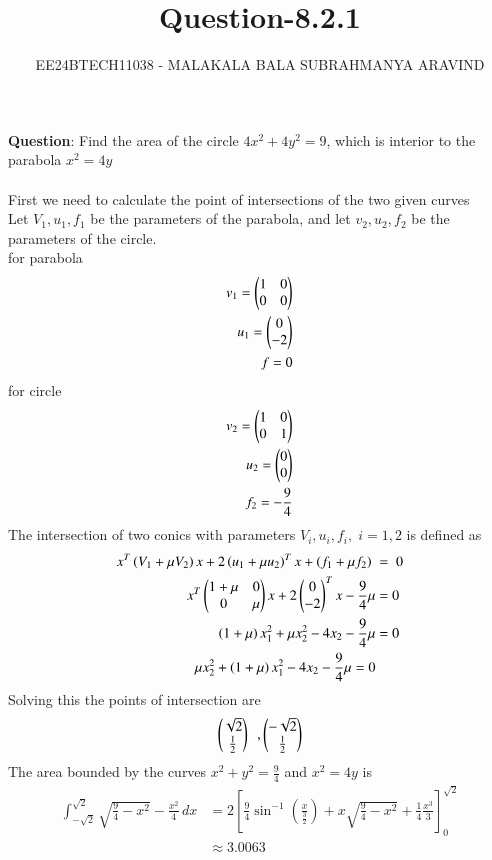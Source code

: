 \documentclass[journal]{IEEEtran}
\numberwithin{equation}{enumi}
\numberwithin{figure}{enumi}
\begin{document}

\title{Question-8.2.1}
\author{EE24BTECH11038 - MALAKALA BALA SUBRAHMANYA ARAVIND}
{\let\newpage\relax\maketitle}
\textbf{Question}:
Find the area of the circle $4x^2+4y^2=9$, which is interior to the parabola $x^2=4y$\\
\solution \\


First we need to calculate the point of intersections of the two given curves\\
Let $V_1,u_1,f_1$ be the parameters of the parabola, and let $v_2,u_2,f_2$ be the parameters of the circle.\\
for parabola 
\begin{align}
    v_1=\begin{pmatrix}1 &0 \\ 0 & 0\end{pmatrix}\\
    u_1=\begin{pmatrix}0\\-2\end{pmatrix}\\
    f=0
\end{align}
for circle
\begin{align}
    v_2=\begin{pmatrix}1 &0 \\ 0& 1\end{pmatrix}\\
    u_2=\begin{pmatrix}0\\0\end{pmatrix}\\
    f_2=-\frac{9}{4}
\end{align}
The intersection of two conics with parameters $V_i,u_i,f_i,\;i= 1,2$ is defined as
\begin{align}
x^T\left(V_1+\mu V_2\right)x+2\left(u_1+\mu u_2\right)^T x + \left(f_1+\mu f_2\right)\;&=\;0\\
x^T\begin{pmatrix}1+\mu & 0 \\ 0 & \mu\end{pmatrix}x+2\begin{pmatrix}0\\-2\end{pmatrix}^Tx-\frac{9}{4}\mu &=0\\
\left(1+\mu\right)x_1^2+\mu x_2^2-4x_2-\frac{9}{4}\mu&=0\\
\mu x_2^2+\left(1+\mu\right)x_1^2-4x_2-\frac{9}{4} \mu=0
\end{align}
Solving this the points of intersection are 
\begin{align}
\begin{pmatrix}\sqrt{2}\\\frac{1}{2}\end{pmatrix}\,\,\, , \begin{pmatrix}-\sqrt{2}\\\frac{1}{2}\end{pmatrix}
\end{align}
The area bounded by the curves $x^2+y^2=\frac{9}{4}$ and $x^2=4y$ is 
\begin{align}
    \int_{-\sqrt{2}}^{\sqrt{2}} \sqrt{\frac{9}{4}-x^2}-\frac{x^2}{4} \, dx 
    &= 2\left[\frac{9}{4}\sin^{-1}\left(\frac{x}{\frac{3}{2}}\right)+x\sqrt{\frac{9}{4}-x^2}+\frac{1}{4}\frac{x^3}{3}\right]_0^{\sqrt{2}} \\
    &\approx 3.0063
\end{align}
\end{document}
